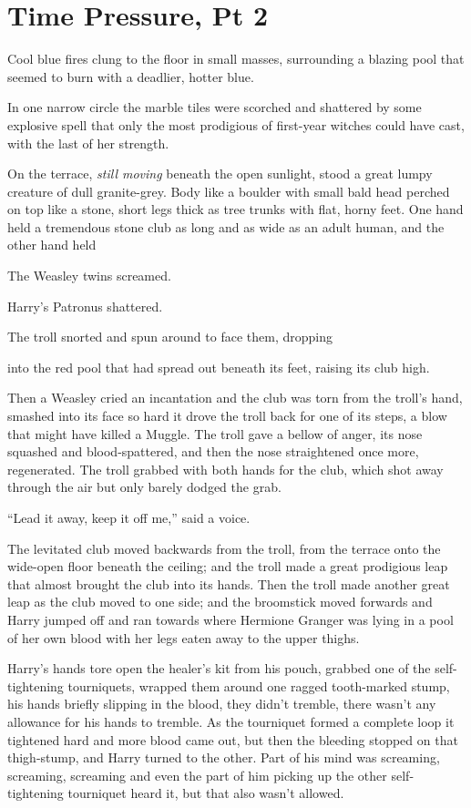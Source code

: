 \chapter{Time Pressure, Pt 2}

Cool blue fires clung to the floor in small masses, surrounding a
blazing pool that seemed to burn with a deadlier, hotter blue.

In one narrow circle the marble tiles were scorched and shattered by
some explosive spell that only the most prodigious of first-year witches
could have cast, with the last of her strength.

On the terrace, \emph{still moving} beneath the open sunlight, stood a
great lumpy creature of dull granite-grey. Body like a boulder with
small bald head perched on top like a stone, short legs thick as tree
trunks with flat, horny feet. One hand held a tremendous stone club as
long and as wide as an adult human, and the other hand held

The Weasley twins screamed.

Harry's Patronus shattered.

The troll snorted and spun around to face them, dropping

into the red pool that had spread out beneath its feet, raising its club
high.

Then a Weasley cried an incantation and the club was torn from the
troll's hand, smashed into its face so hard it drove the troll back for
one of its steps, a blow that might have killed a Muggle. The troll gave
a bellow of anger, its nose squashed and blood-spattered, and then the
nose straightened once more, regenerated. The troll grabbed with both
hands for the club, which shot away through the air but only barely
dodged the grab.

``Lead it away, keep it off me,'' said a voice.

The levitated club moved backwards from the troll, from the terrace onto
the wide-open floor beneath the ceiling; and the troll made a great
prodigious leap that almost brought the club into its hands. Then the
troll made another great leap as the club moved to one side; and the
broomstick moved forwards and Harry jumped off and ran towards where
Hermione Granger was lying in a pool of her own blood with her legs
eaten away to the upper thighs.

Harry's hands tore open the healer's kit from his pouch, grabbed one of
the self-tightening tourniquets, wrapped them around one ragged
tooth-marked stump, his hands briefly slipping in the blood, they didn't
tremble, there wasn't any allowance for his hands to tremble. As the
tourniquet formed a complete loop it tightened hard and more blood came
out, but then the bleeding stopped on that thigh-stump, and Harry turned
to the other. Part of his mind was screaming, screaming, screaming and
even the part of him picking up the other self-tightening tourniquet
heard it, but that also wasn't allowed.

